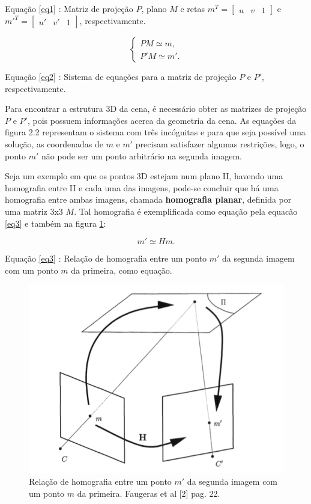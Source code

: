 Equação \eqref{eq1} : Matriz de projeção $P$, plano $M$ e retas $m^T = \begin{bmatrix}u & v & 1\end{bmatrix}$ e $m'^T = \begin{bmatrix}u' & v' & 1\end{bmatrix}$, respectivamente.

\begin{equation}\label{eq2}
\begin{cases}
P M \simeq m, \\
P' M \simeq m'.
\end{cases}
\end{equation}

Equação \eqref{eq2} : Sistema de equações para a matriz de projeção $P$ e $P'$, respectivamente.

Para encontrar a estrutura 3D da cena, é necessário obter as matrizes de projeção $P$ e $P'$, pois possuem informações acerca da geometria da cena. As equações da figura 2.2 representam o sistema com três incógnitas e para que seja possível uma solução, as coordenadas de $m$ e $m'$ precisam satisfazer algumas restrições, logo, o ponto $m'$ não pode ser um ponto arbitrário na segunda imagem.

Seja um exemplo em que os pontos 3D estejam num plano II, havendo uma homografia \cite{Faugeras-Geometry} entre II e cada uma das imagens, pode-se concluir que há uma homografia entre ambas imagens, chamada \textbf{homografia planar}, definida por uma matriz 3x3 $M$. Tal homografia é exemplificada como equação pela equacão \eqref{eq3} e também na figura \ref{fig1}:

\begin{equation}\label{eq3}
m' \simeq Hm.
\end{equation}

Equação \eqref{eq3} : Relação de homografia entre um ponto $m'$ da segunda imagem com um ponto $m$ da primeira, como equação.

\begin{figure}
	\centering
		\includegraphics{Imagens/figura2-1.png}
	\caption{Relação de homografia entre um ponto $m'$ da segunda imagem com um ponto $m$ da primeira. Faugeras et al [2] pag. 22.}
	\label{fig1}
\end{figure}


